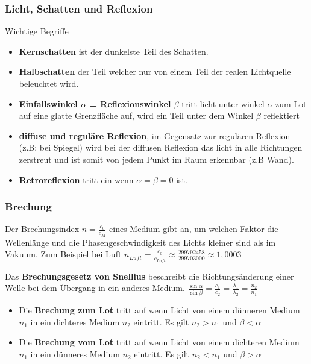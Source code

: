 \documentclass[../document.tex]{subfiles}
\begin{document}
\subsubsection {Licht, Schatten und Reflexion}
Wichtige Begriffe
\begin{itemize} 
	\item \textbf{Kernschatten} ist der dunkelste Teil des Schatten.
	\item \textbf{Halbschatten} der Teil welcher nur von einem Teil der realen Lichtquelle beleuchtet wird.
	\item \textbf{Einfallswinkel $\alpha$ = Reflexionswinkel $\beta$} tritt licht unter winkel $\alpha$ zum Lot auf eine glatte Grenzfläche auf, wird ein Teil unter dem Winkel $\beta$ reflektiert
	\item \textbf{diffuse und reguläre Reflexion}, im Gegensatz zur regulären Reflexion (z.B: bei Spiegel) wird bei der diffusen Reflexion das licht in alle Richtungen zerstreut und ist somit von jedem Punkt im Raum erkennbar (z.B Wand).
	\item \textbf{Retroreflexion} tritt ein wenn $\alpha = \beta = 0$ ist.
\end{itemize}

\subsubsection{Brechung}

Der Brechungsindex $n = \frac{c_0}{c_M}$ eines Medium gibt an, um welchen Faktor die Wellenlänge und die Phasengeschwindigkeit des Lichts kleiner sind als im Vakuum. Zum Beispiel bei Luft $n_{Luft} = \frac{c_0}{c_{Luft}} \approx \frac{299792458}{299703000} \approx 1,0003$

Das \textbf{Brechungsgesetz von Snellius} beschreibt die Richtungsänderung einer Welle bei dem Übergang in ein anderes Medium. 
$\frac{\sin\alpha}{\sin\beta} = \frac{c_1}{c_2} = \frac{\lambda_1}{\lambda_2} = \frac{n_2}{n_1}$

\begin{itemize}
	\item Die \textbf{Brechung zum Lot} tritt auf wenn Licht von einem dünneren Medium $n_1$ in ein dichteres Medium $n_2$ eintritt. Es gilt $n_2 > n_1$ und $\beta < \alpha$
	\item Die \textbf{Brechung vom Lot} tritt auf wenn Licht von einem dichteren Medium $n_1$ in ein dünneres Medium $n_2$ eintritt. Es gilt $n_2 < n_1$ und $\beta > \alpha$
\end{itemize}
\end{document}
